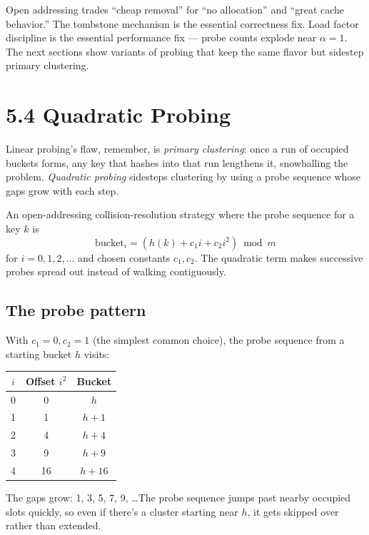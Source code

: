 \documentclass[11pt]{article}
\begin{document}
\begin{ideabox}
Open addressing trades ``cheap removal'' for ``no allocation''
and ``great cache behavior.'' The tombstone mechanism is the
essential correctness fix. Load factor discipline is the
essential performance fix --- probe counts explode near $\alpha =
1$. The next sections show variants of probing that keep the
same flavor but sidestep primary clustering.
\end{ideabox}

\section{5.4 Quadratic Probing}

Linear probing's flaw, remember, is \emph{primary clustering}:
once a run of occupied buckets forms, any key that hashes into
that run lengthens it, snowballing the problem. \emph{Quadratic
probing} sidesteps clustering by using a probe sequence whose
gaps grow with each step.

\begin{defnbox}
An open-addressing collision-resolution strategy where the probe
sequence for a key $k$ is
$$\text{bucket}_i = (h(k) + c_1 i + c_2 i^2) \bmod m$$
for $i = 0, 1, 2, \ldots$ and chosen constants $c_1, c_2$. The
quadratic term makes successive probes spread out instead of
walking contiguously.
\end{defnbox}

\subsection*{The probe pattern}

With $c_1 = 0, c_2 = 1$ (the simplest common choice), the probe
sequence from a starting bucket $h$ visits:

\begin{center}
\begin{tabular}{|c|c|c|}
\hline
$i$ & Offset $i^2$ & Bucket \\
\hline
0 & 0  & $h$ \\
1 & 1  & $h+1$ \\
2 & 4  & $h+4$ \\
3 & 9  & $h+9$ \\
4 & 16 & $h+16$ \\
\hline
\end{tabular}
\end{center}

The gaps grow: 1, 3, 5, 7, 9, \ldots The probe sequence jumps
past nearby occupied slots quickly, so even if there's a cluster
starting near $h$, it gets skipped over rather than extended.
\end{document}
